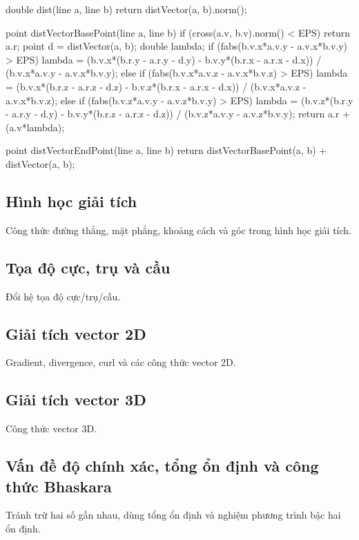 \documentclass[11pt]{article}
\begin{document}
\begin{vncode}
double dist(line a, line b) {
	return distVector(a, b).norm();
}

point distVectorBasePoint(line a, line b) {
	if (cross(a.v, b.v).norm() < EPS) return a.r;
	point d = distVector(a, b);
	double lambda;
	if (fabs(b.v.x*a.v.y - a.v.x*b.v.y) > EPS)
		lambda = (b.v.x*(b.r.y - a.r.y - d.y) - b.v.y*(b.r.x - a.r.x - d.x)) / (b.v.x*a.v.y - a.v.x*b.v.y);
	else if (fabs(b.v.x*a.v.z - a.v.x*b.v.z) > EPS)
		lambda = (b.v.x*(b.r.z - a.r.z - d.z) - b.v.z*(b.r.x - a.r.x - d.x)) / (b.v.x*a.v.z - a.v.x*b.v.z);
	else if (fabs(b.v.z*a.v.y - a.v.z*b.v.y) > EPS)
		lambda = (b.v.z*(b.r.y - a.r.y - d.y) - b.v.y*(b.r.z - a.r.z - d.z)) / (b.v.z*a.v.y - a.v.z*b.v.y);
	return a.r + (a.v*lambda);
}

point distVectorEndPoint(line a, line b) {
	return distVectorBasePoint(a, b) + distVector(a, b);
}
\end{vncode}
\endgroup


\subsection{Hình học giải tích}

Công thức đường thẳng, mặt phẳng, khoảng cách và góc trong hình học giải tích.

\subsection{Tọa độ cực, trụ và cầu}

Đổi hệ tọa độ cực/trụ/cầu.

\subsection{Giải tích vector 2D}

Gradient, divergence, curl và các công thức vector 2D.

\subsection{Giải tích vector 3D}

Công thức vector 3D.

\subsection{Vấn đề độ chính xác, tổng ổn định và công thức Bhaskara}

Tránh trừ hai số gần nhau, dùng tổng ổn định và nghiệm phương trình bậc hai ổn định.
\end{document}
